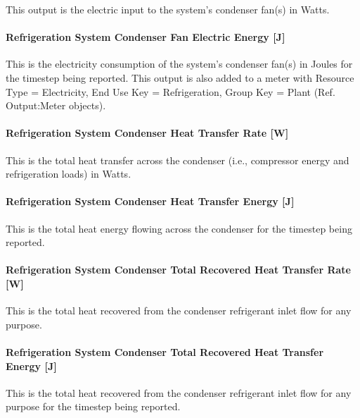 This output is the electric input to the system's condenser fan(s) in Watts.

\paragraph{Refrigeration System Condenser Fan Electric Energy {[}J{]}}\label{refrigeration-system-condenser-fan-electric-energy-j}

This is the electricity consumption of the system's condenser fan(s) in Joules for the timestep being reported. This output is also added to a meter with Resource Type = Electricity, End Use Key = Refrigeration, Group Key = Plant (Ref. Output:Meter objects).

\paragraph{Refrigeration System Condenser Heat Transfer Rate {[}W{]}}\label{refrigeration-system-condenser-heat-transfer-rate-w-1}

This is the total heat transfer across the condenser (i.e., compressor energy and refrigeration loads) in Watts.

\paragraph{Refrigeration System Condenser Heat Transfer Energy {[}J{]}}\label{refrigeration-system-condenser-heat-transfer-energy-j-1}

This is the total heat energy flowing across the condenser for the timestep being reported.

\paragraph{Refrigeration System Condenser Total Recovered Heat Transfer Rate~ {[}W{]}}\label{refrigeration-system-condenser-total-recovered-heat-transfer-rate-w-1}

This is the total heat recovered from the condenser refrigerant inlet flow for any purpose.

\paragraph{Refrigeration System Condenser Total Recovered Heat Transfer Energy {[}J{]}}\label{refrigeration-system-condenser-total-recovered-heat-transfer-energy-j-1}

This is the total heat recovered from the condenser refrigerant inlet flow for any purpose for the timestep being reported.

